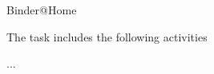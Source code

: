 \begin{task}[
  title=Binder @Home,
  id=binder-at-home,
  lead=SRL,
  PM=1,
  wphases={0-36},
  partners={XXX}
]
  Binder@Home

  The task includes the following activities
  \begin{compactitem}
  \item ...
  \end{compactitem}
\end{task}
